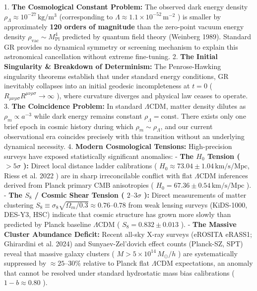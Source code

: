 \documentclass[11pt,a4paper]{article}
\theoremstyle{definition}\newtheorem{definition}{Definition}
\theoremstyle{remark}\newtheorem{remark}{Remark}
\begin{document}
1. \textbf{The Cosmological Constant Problem:} The observed dark energy density $\rho_\Lambda \approx 10^{-27} \, \mathrm{kg/m^3}$ (corresponding to $\Lambda \approx 1.1 \times 10^{-52} \, \mathrm{m^{-2}}$ ) is smaller by approximately \textbf{120 orders of magnitude} than the zero-point vacuum energy density $\rho_{\text{vac}} \sim M_{\text{Pl}}^4$ predicted by quantum field theory (Weinberg 1989). Standard GR provides no dynamical symmetry or screening mechanism to explain this astronomical cancellation without extreme fine-tuning.
2. \textbf{The Initial Singularity \& Breakdown of Determinism:} The Penrose-Hawking singularity theorems establish that under standard energy conditions, GR inevitably collapses into an initial geodesic incompleteness at $t = 0$ ( $R_{\mu\nu\rho\sigma} R^{\mu\nu\rho\sigma} \to \infty$ ), where curvature diverges and physical law ceases to operate.
3. \textbf{The Coincidence Problem:} In standard $\Lambda\text{CDM}$, matter density dilutes as $\rho_m \propto a^{-3}$ while dark energy remains constant $\rho_\Lambda = \text{const}$. There exists only one brief epoch in cosmic history during which $\rho_m \sim \rho_\Lambda$, and our current observational era coincides precisely with this transition without an underlying dynamical necessity.
4. \textbf{Modern Cosmological Tensions:} High-precision surveys have exposed statistically significant anomalies:
   - \textbf{The $H_0$ Tension ( $> 5\sigma$ ):} Direct local distance ladder calibrations ( $H_0 \approx 73.04 \pm 1.04 \, \mathrm{km/s/Mpc}$, Riess et al. 2022 ) are in sharp irreconcilable conflict with flat $\Lambda\text{CDM}$ inferences derived from Planck primary CMB anisotropies ( $H_0 = 67.36 \pm 0.54 \, \mathrm{km/s/Mpc}$ ).
   - \textbf{The $S_8$ / Cosmic Shear Tension ( $2\text{--}3\sigma$ ):} Direct measurements of matter clustering $S_8 \equiv \sigma_8 \sqrt{\Omega_m/0.3} \approx 0.76\text{--}0.78$ from weak lensing surveys (KiDS-1000, DES-Y3, HSC) indicate that cosmic structure has grown more slowly than predicted by Planck baseline $\Lambda\text{CDM}$ ( $S_8 = 0.832 \pm 0.013$ ).
   - \textbf{The Massive Cluster Abundance Deficit:} Recent all-sky X-ray surveys (eROSITA eRASS1; Ghirardini et al. 2024) and Sunyaev-Zel'dovich effect counts (Planck-SZ, SPT) reveal that massive galaxy clusters ( $M > 5 \times 10^{14} \, M_\odot/h$ ) are systematically suppressed by $\approx 25\text{--}30\%$ relative to Planck flat $\Lambda\text{CDM}$ expectations, an anomaly that cannot be resolved under standard hydrostatic mass bias calibrations ( $1-b \approx 0.80$ ).
\end{document}
